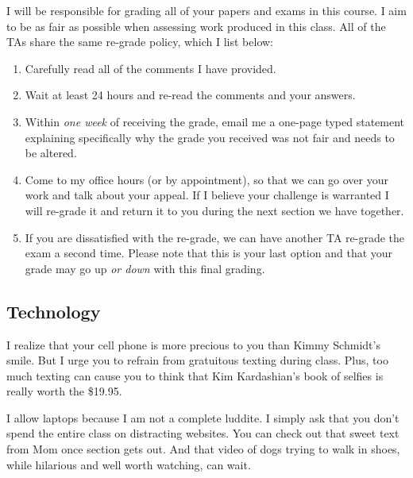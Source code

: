 \documentclass[12pt]{article}
\begin{document}
I will be responsible for grading all of your papers and exams in this course. I aim to be as fair as possible when assessing work produced in this class. All of the TAs share the same re-grade policy, which I list below:

\begin{enumerate}
 \item Carefully read all of the comments I have provided.
  \item Wait at least 24 hours and re-read the comments and your answers.
  \item Within \textit{one week} of receiving the grade, email me a one-page typed statement explaining specifically why the grade you received was not fair and needs to be altered.
  \item Come to my office hours (or by appointment), so that we can go over your work and talk about your appeal. If I believe your challenge is warranted I will re-grade it and return it to you during the next section we have together. 
  \item If you are dissatisfied with the re-grade, we can have another TA re-grade the exam a second time. Please note that this is your last option and that your grade may go up \textit{or down} with this final grading.
\end{enumerate}

\subsection*{Technology}
I realize that your cell phone is more precious to you than Kimmy Schmidt's smile. But I urge you to refrain from gratuitous texting during class. Plus, too much texting can cause you to think that Kim Kardashian's book of selfies is really worth the \$19.95. 

I allow laptops because I am not a complete luddite. I simply ask that you don't spend the entire class on distracting websites. You can check out that sweet text from Mom once section gets out. And that video of dogs trying to walk in shoes, while hilarious and well worth watching, can wait.
\end{document}
